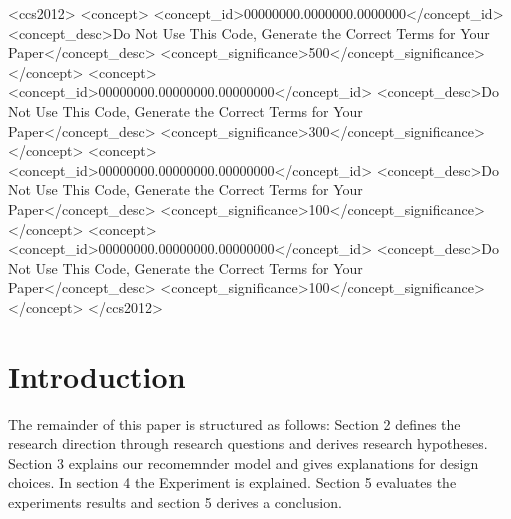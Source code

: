\documentclass[sigconf]{acmart}
\begin{document}
\begin{CCSXML}
<ccs2012>
 <concept>
  <concept_id>00000000.0000000.0000000</concept_id>
  <concept_desc>Do Not Use This Code, Generate the Correct Terms for Your Paper</concept_desc>
  <concept_significance>500</concept_significance>
 </concept>
 <concept>
  <concept_id>00000000.00000000.00000000</concept_id>
  <concept_desc>Do Not Use This Code, Generate the Correct Terms for Your Paper</concept_desc>
  <concept_significance>300</concept_significance>
 </concept>
 <concept>
  <concept_id>00000000.00000000.00000000</concept_id>
  <concept_desc>Do Not Use This Code, Generate the Correct Terms for Your Paper</concept_desc>
  <concept_significance>100</concept_significance>
 </concept>
 <concept>
  <concept_id>00000000.00000000.00000000</concept_id>
  <concept_desc>Do Not Use This Code, Generate the Correct Terms for Your Paper</concept_desc>
  <concept_significance>100</concept_significance>
 </concept>
</ccs2012>
\end{CCSXML}





\maketitle

\section{Introduction}

The remainder of this paper is structured as follows: Section 2 defines the research direction through research questions and derives research hypotheses. Section 3 explains our recomemnder model and gives explanations for design choices. In section 4 the Experiment is explained. Section 5  evaluates the experiments results and section 5 derives a conclusion.
\end{document}
